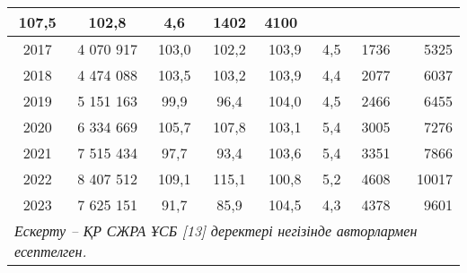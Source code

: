 \begin{table}[H]
{\begin{tabular}{|lllllrrr|}
  \multicolumn{1}{c|}{107,5} &
  \multicolumn{1}{c|}{102,8} &
  \multicolumn{1}{c|}{4,6} &
  \multicolumn{1}{c|}{1402} &
  4100 \\ \hline
\multicolumn{1}{|c|}{2017} &
  \multicolumn{1}{c|}{4 070 917} &
  \multicolumn{1}{c|}{103,0} &
  \multicolumn{1}{c|}{102,2} &
  \multicolumn{1}{c|}{103,9} &
  \multicolumn{1}{c|}{4,5} &
  \multicolumn{1}{c|}{1736} &
  5325 \\ \hline
\multicolumn{1}{|c|}{2018} &
  \multicolumn{1}{c|}{4 474 088} &
  \multicolumn{1}{c|}{103,5} &
  \multicolumn{1}{c|}{103,2} &
  \multicolumn{1}{c|}{103,9} &
  \multicolumn{1}{c|}{4,4} &
  \multicolumn{1}{c|}{2077} &
  6037 \\ \hline
\multicolumn{1}{|c|}{2019} &
  \multicolumn{1}{c|}{5 151 163} &
  \multicolumn{1}{c|}{99,9} &
  \multicolumn{1}{c|}{96,4} &
  \multicolumn{1}{c|}{104,0} &
  \multicolumn{1}{c|}{4,5} &
  \multicolumn{1}{c|}{2466} &
  6455 \\ \hline
\multicolumn{1}{|c|}{2020} &
  \multicolumn{1}{c|}{6 334 669} &
  \multicolumn{1}{c|}{105,7} &
  \multicolumn{1}{c|}{107,8} &
  \multicolumn{1}{c|}{103,1} &
  \multicolumn{1}{c|}{5,4} &
  \multicolumn{1}{c|}{3005} &
  7276 \\ \hline
\multicolumn{1}{|c|}{2021} &
  \multicolumn{1}{c|}{7 515 434} &
  \multicolumn{1}{c|}{97,7} &
  \multicolumn{1}{c|}{93,4} &
  \multicolumn{1}{c|}{103,6} &
  \multicolumn{1}{c|}{5,4} &
  \multicolumn{1}{c|}{3351} &
  7866 \\ \hline
\multicolumn{1}{|c|}{2022} &
  \multicolumn{1}{c|}{8 407 512} &
  \multicolumn{1}{c|}{109,1} &
  \multicolumn{1}{c|}{115,1} &
  \multicolumn{1}{c|}{100,8} &
  \multicolumn{1}{c|}{5,2} &
  \multicolumn{1}{c|}{4608} &
  10017 \\ \hline
\multicolumn{1}{|c|}{2023} &
  \multicolumn{1}{c|}{7 625 151} &
  \multicolumn{1}{c|}{91,7} &
  \multicolumn{1}{c|}{85,9} &
  \multicolumn{1}{c|}{104,5} &
  \multicolumn{1}{c|}{4,3} &
  \multicolumn{1}{c|}{4378} &
  9601 \\ \hline
\multicolumn{8}{|l|}{\textit{Ескерту – ҚР СЖРА ҰСБ {[}13{]} деректері негізінде авторлармен есептелген.}} \\ \hline
\end{tabular}}
\end{table}

